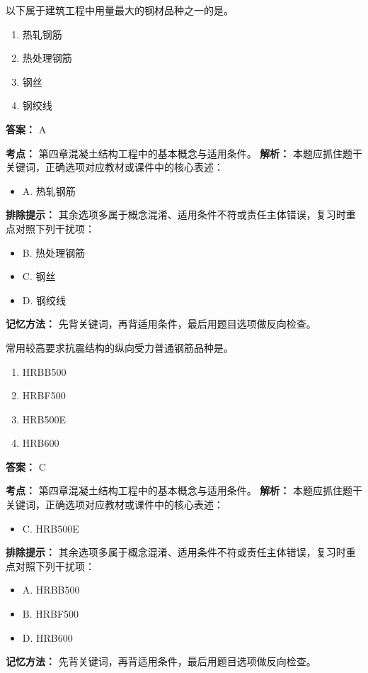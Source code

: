 \documentclass[UTF8,fontset=fandol,11pt]{ctexart}
\begin{document}
\begin{quizbox}[title={第 1 题}]
以下属于建筑工程中用量最大的钢材品种之一的是。\\
\begin{enumerate}[label=\Alph*.]
\item 热轧钢筋
\item 热处理钢筋
\item 钢丝
\item 钢绞线
\end{enumerate}
\textbf{答案：} A
\vspace{0.25em}
\begin{answerbox}[title={考点解析}]
\textbf{考点：} 第四章混凝土结构工程中的基本概念与适用条件。
\textbf{解析：} 本题应抓住题干关键词，正确选项对应教材或课件中的核心表述：
\begin{itemize}
\item A. 热轧钢筋
\end{itemize}
\textbf{排除提示：} 其余选项多属于概念混淆、适用条件不符或责任主体错误，复习时重点对照下列干扰项：
\begin{itemize}
\item B. 热处理钢筋
\item C. 钢丝
\item D. 钢绞线
\end{itemize}
\textbf{记忆方法：} 先背关键词，再背适用条件，最后用题目选项做反向检查。
\end{answerbox}
\end{quizbox}

\vspace{0.2em}

\begin{quizbox}[title={第 2 题}]
常用较高要求抗震结构的纵向受力普通钢筋品种是。\\
\begin{enumerate}[label=\Alph*.]
\item HRBB500
\item HRBF500
\item HRB500E
\item HRB600
\end{enumerate}
\textbf{答案：} C
\vspace{0.25em}
\begin{answerbox}[title={考点解析}]
\textbf{考点：} 第四章混凝土结构工程中的基本概念与适用条件。
\textbf{解析：} 本题应抓住题干关键词，正确选项对应教材或课件中的核心表述：
\begin{itemize}
\item C. HRB500E
\end{itemize}
\textbf{排除提示：} 其余选项多属于概念混淆、适用条件不符或责任主体错误，复习时重点对照下列干扰项：
\begin{itemize}
\item A. HRBB500
\item B. HRBF500
\item D. HRB600
\end{itemize}
\textbf{记忆方法：} 先背关键词，再背适用条件，最后用题目选项做反向检查。
\end{answerbox}
\end{quizbox}
\end{document}
